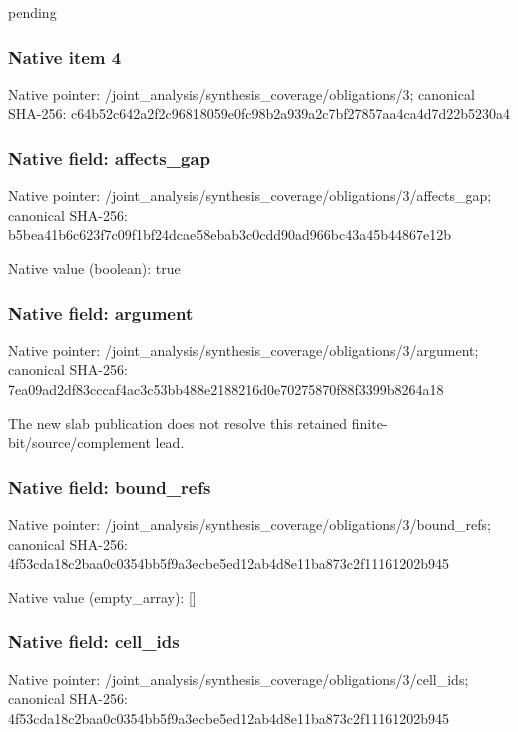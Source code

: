 \documentclass[10pt,a4paper]{article}
\begin{document}
\begingroup\raggedright\sloppy pending\par\endgroup

\subsubsection{Native item 4}
Native pointer: /joint\_\allowbreak{}analysis/synthesis\_\allowbreak{}coverage/obligations/3; canonical SHA-256: c64b52c642a2f2c96818059e0fc98b2a939a2c7bf27857aa4ca4d7d22b5230a4

\subsubsection{Native field: affects\_\allowbreak{}gap}
Native pointer: /joint\_\allowbreak{}analysis/synthesis\_\allowbreak{}coverage/obligations/3/affects\_\allowbreak{}gap; canonical SHA-256: b5bea41b6c623f7c09f1bf24dcae58ebab3c0cdd90ad966bc43a45b44867e12b

Native value (boolean): true

\subsubsection{Native field: argument}
Native pointer: /joint\_\allowbreak{}analysis/synthesis\_\allowbreak{}coverage/obligations/3/argument; canonical SHA-256: 7ea09ad2df83cccaf4ac3c53bb488e2188216d0e70275870f88f3399b8264a18

\begingroup\raggedright\sloppy The new slab publication does not resolve this retained finite-bit/\allowbreak{}source/\allowbreak{}complement lead.\par\endgroup

\subsubsection{Native field: bound\_\allowbreak{}refs}
Native pointer: /joint\_\allowbreak{}analysis/synthesis\_\allowbreak{}coverage/obligations/3/bound\_\allowbreak{}refs; canonical SHA-256: 4f53cda18c2baa0c0354bb5f9a3ecbe5ed12ab4d8e11ba873c2f11161202b945

Native value (empty\_\allowbreak{}array): []

\subsubsection{Native field: cell\_\allowbreak{}ids}
Native pointer: /joint\_\allowbreak{}analysis/synthesis\_\allowbreak{}coverage/obligations/3/cell\_\allowbreak{}ids; canonical SHA-256: 4f53cda18c2baa0c0354bb5f9a3ecbe5ed12ab4d8e11ba873c2f11161202b945
\end{document}

